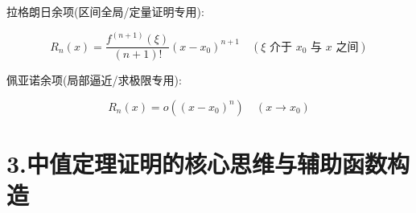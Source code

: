 \documentclass[11pt,a4paper,UTF8]{ctexart}
\begin{document}
拉格朗日余项(区间全局/定量证明专用):


\begin{equation*}
R_n(x) = \frac{f^{(n+1)}(\xi)}{(n+1)!}(x - x_0)^{n+1} \quad(\xi \text{ 介于 } x_0 \text{ 与 } x \text{ 之间})
\end{equation*}

佩亚诺余项(局部逼近/求极限专用):

\begin{equation*}
R_n(x) = o\left((x - x_0)^n\right) \quad(x \to x_0)
\end{equation*}


\section{3.中值定理证明的核心思维与辅助函数构造}
\end{document}
